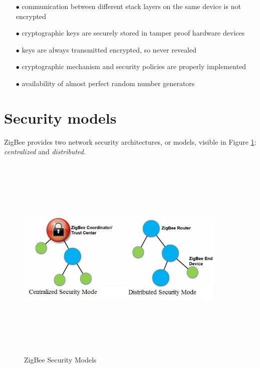 \documentclass[12pt]{report}
\begin{document}
{\begin{itemize}
\setlength{\itemindent}{+4mm}
\item[$\bullet$] communication between different stack layers on the same device is not encrypted
\item[$\bullet$] cryptographic keys are securely stored in tamper proof hardware devices
\item[$\bullet$] keys are always transmitted encrypted, so never revealed
\item[$\bullet$] cryptographic mechanism and security policies are properly implemented
\item[$\bullet$] availability of almost perfect random number generators\\
\end{itemize}

\clearpage
\section{Security models}
\bigskip

ZigBee provides two network security architectures, or models, visible in Figure \ref{fig:zigbeemodels}: \emph{centralized} and \emph{distributed}.\\

\begin{figure}[H]
\includegraphics[width=10cm,height=10cm,keepaspectratio]{security_models}
\centering
\caption{ZigBee Security Models}
\label{fig:zigbeemodels}
\end{figure}

}
\end{document}
